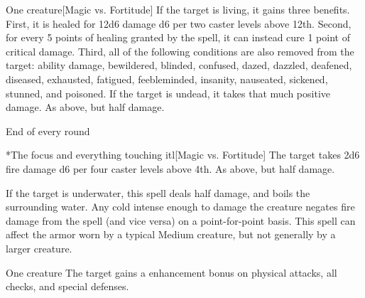 \spellrng{\rngclose}
\begin{spelltarget}{One creature}[Magic vs. Fortitude]
    \spelleffect If the target is living, it gains three benefits. First, it is healed for 12d6 damage \add d6 per two caster levels above 12th. Second, for every 5 points of healing granted by the spell, it can instead cure 1 point of critical damage. Third, all of the following conditions are also removed from the target: ability damage, bewildered, blinded, confused, dazed, dazzled, deafened, diseased, exhausted, fatigued, feebleminded, insanity, nauseated, sickened, stunned, and poisoned.
    \spellsuccess If the target is undead, it takes that much positive damage.
    \spellfailure As above, but half damage.
\end{spelltarget}

\spellrng{\rngmed}
\spelldur{\durshort \dismissable}
\begin{spelltrigger}{End of every round}
    \begin{spelltargets}*{The focus and everything touching it}l[Magic vs. Fortitude]
        \spellsuccess The target takes 2d6 fire damage \add d6 per four caster levels above 4th.
        \spellfailure As above, but half damage.
    \end{spelltargets}
\end{spelltrigger}
\spellnotes If the target is underwater, this spell deals half damage, and boils the surrounding water. Any cold intense enough to damage the creature negates fire damage from the spell (and vice versa) on a point-for-point basis. This spell can affect the armor worn by a typical Medium creature, but not generally by a larger creature.

\spellrng{\rngclose}
\spelldur{\durshort \dismissable}
\begin{spelltarget}{One creature}
    \spelleffect The target gains a  enhancement bonus on physical attacks, all checks, and special defenses. \spellbonusscalingdescription
\end{spelltarget}

